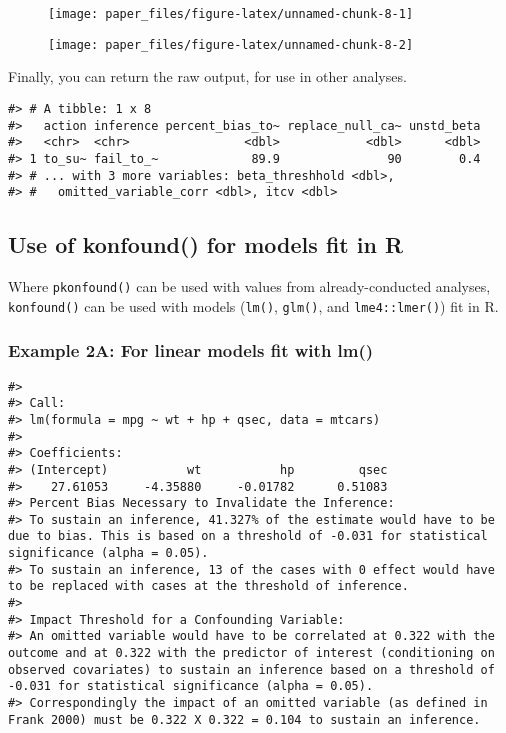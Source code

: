 \documentclass[man]{apa6}
\begin{document}
\begin{figure}

{\centering \texttt{[image: paper\_files/figure-latex/unnamed-chunk-8-1]} 

}

\caption{ }\label{fig:unnamed-chunk-81}
\end{figure}\begin{figure}

{\centering \texttt{[image: paper\_files/figure-latex/unnamed-chunk-8-2]} 

}

\caption{ }\label{fig:unnamed-chunk-82}
\end{figure}

Finally, you can return the raw output, for use in other analyses.

\begin{verbatim}
#> # A tibble: 1 x 8
#>   action inference percent_bias_to~ replace_null_ca~ unstd_beta
#>   <chr>  <chr>                <dbl>            <dbl>      <dbl>
#> 1 to_su~ fail_to_~             89.9               90        0.4
#> # ... with 3 more variables: beta_threshhold <dbl>,
#> #   omitted_variable_corr <dbl>, itcv <dbl>
\end{verbatim}

\subsection{Use of konfound() for models fit in
R}\label{use-of-konfound-for-models-fit-in-r}

Where \texttt{pkonfound()} can be used with values from
already-conducted analyses, \texttt{konfound()} can be used with models
(\texttt{lm()}, \texttt{glm()}, and \texttt{lme4::lmer()}) fit in R.

\subsubsection{Example 2A: For linear models fit with
lm()}\label{example-2a-for-linear-models-fit-with-lm}

\begin{verbatim}
#> 
#> Call:
#> lm(formula = mpg ~ wt + hp + qsec, data = mtcars)
#> 
#> Coefficients:
#> (Intercept)           wt           hp         qsec  
#>    27.61053     -4.35880     -0.01782      0.51083
#> Percent Bias Necessary to Invalidate the Inference:
#> To sustain an inference, 41.327% of the estimate would have to be due to bias. This is based on a threshold of -0.031 for statistical significance (alpha = 0.05).
#> To sustain an inference, 13 of the cases with 0 effect would have to be replaced with cases at the threshold of inference.
#> 
#> Impact Threshold for a Confounding Variable:
#> An omitted variable would have to be correlated at 0.322 with the outcome and at 0.322 with the predictor of interest (conditioning on observed covariates) to sustain an inference based on a threshold of -0.031 for statistical significance (alpha = 0.05).
#> Correspondingly the impact of an omitted variable (as defined in Frank 2000) must be 0.322 X 0.322 = 0.104 to sustain an inference.
\end{verbatim}
\end{document}
